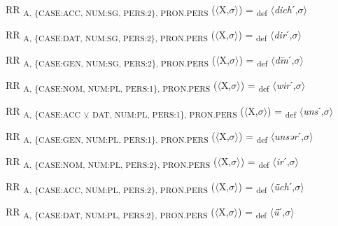 {\begin{exe}
 RR \textsubscript{A, \{CASE:ACC, NUM:SG, PERS:2\}, PRON.PERS} ($\langle$X,$\sigma $$\rangle$) = \textsubscript{def} $\langle$\textit{dich}ˊ,$\sigma $$\rangle$
\end{exe}

\begin{exe}
 RR \textsubscript{A, \{CASE:DAT, NUM:SG, PERS:2\}, PRON.PERS} ($\langle$X,$\sigma $$\rangle$) = \textsubscript{def} $\langle$\textit{dir}ˊ,$\sigma $$\rangle$
\end{exe}

\begin{exe}
 RR \textsubscript{A, \{CASE:GEN, NUM:SG, PERS:2\}, PRON.PERS} ($\langle$X,$\sigma $$\rangle$) = \textsubscript{def} $\langle$\textit{d\=in}ˊ,$\sigma $$\rangle$
\end{exe}

\begin{exe}
 RR \textsubscript{A, \{CASE:NOM, NUM:PL, PERS:1\}, PRON.PERS} ($\langle$X,$\sigma $$\rangle$) = \textsubscript{def} $\langle$\textit{wir}ˊ,$\sigma $$\rangle$
\end{exe}

\begin{exe}
 RR \textsubscript{A, \{CASE:ACC} \textsubscript{${\veebar}$}\textsubscript{ DAT, NUM:PL, PERS:1\}, PRON.PERS} ($\langle$X,$\sigma $$\rangle$) = \textsubscript{def} $\langle$\textit{uns}ˊ,$\sigma $$\rangle$
\end{exe}

\begin{exe}
 RR \textsubscript{A, \{CASE:GEN, NUM:PL, PERS:1\}, PRON.PERS} ($\langle$X,$\sigma $$\rangle$) = \textsubscript{def} $\langle$\textit{unsər}ˊ,$\sigma $$\rangle$
\end{exe}

\begin{exe}
 RR \textsubscript{A, \{CASE:NOM, NUM:PL, PERS:2\}, PRON.PERS} ($\langle$X,$\sigma $$\rangle$) = \textsubscript{def} $\langle$\textit{ir}ˊ,$\sigma $$\rangle$
\end{exe}

\begin{exe}
 RR \textsubscript{A, \{CASE:ACC, NUM:PL, PERS:2\}, PRON.PERS} ($\langle$X,$\sigma $$\rangle$) = \textsubscript{def} $\langle$\textit{ǖch}ˊ,$\sigma $$\rangle$
\end{exe}

\begin{exe}
 RR \textsubscript{A, \{CASE:DAT, NUM:PL, PERS:2\}, PRON.PERS} ($\langle$X,$\sigma $$\rangle$) = \textsubscript{def} $\langle$\textit{ǖ}ˊ,$\sigma $$\rangle$
\end{exe}

}
